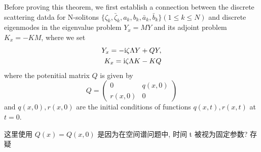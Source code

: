 Before proving this theorem, we first establish a connection between the discrete scattering datda for N-solitons $\{\zeta_{k}, \bar{\zeta}_{k}, a_{k}, b_{k}, \bar{a}_{k}, \bar{b}_{k}\}(1\leq k \leq N) $ and discrete eigenmodes in the eigenvalue problem $ Y_{x} = MY $ and its adjoint problem $ K_{x} = -KM $, where we set 
\begin{subequations}
\begin{align}
    Y_{x} = - \mathrm{i} \zeta \Lambda Y + QY, \label{eq:reverse-x-NLS-eigenvalue}\\
    K_{x} = \mathrm{i} \zeta \Lambda K - KQ \label{eq:reverse-x-NLS-adjoint-eigenvalue}
\end{align}
\end{subequations}
where the potenitial matrix $ Q $ is given by
\begin{equation}
    Q = \begin{pmatrix}
        0 & q(x,0) \\
        r(x,0) & 0
    \end{pmatrix}
\end{equation} 
and $ q(x,0), r(x,0) $ are the initial conditions of functions $ q(x,t), r(x,t) $ at $ t = 0 $. 

\begin{note}
    这里使用 $ Q(x) = Q(x,0) $ 是因为在空间谱问题中, 时间 t 被视为固定参数? 存疑
\end{note}

